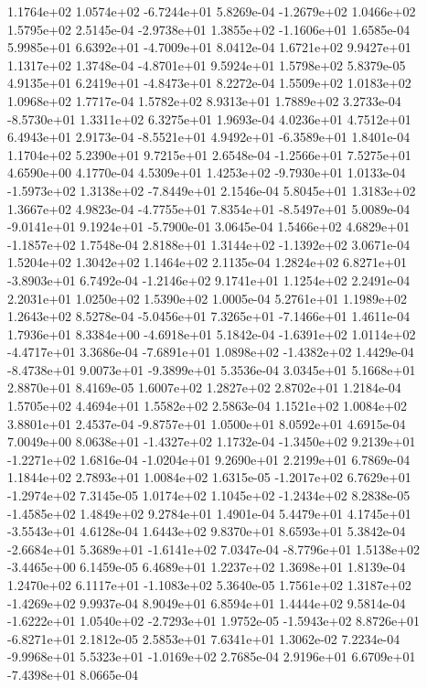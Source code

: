  1.1764e+02  1.0574e+02 -6.7244e+01  5.8269e-04
-1.2679e+02  1.0466e+02  1.5795e+02  2.5145e-04
-2.9738e+01  1.3855e+02 -1.1606e+01  1.6585e-04
 5.9985e+01  6.6392e+01 -4.7009e+01  8.0412e-04
1.6721e+02 9.9427e+01 1.1317e+02  1.3748e-04
-4.8701e+01  9.5924e+01  1.5798e+02  5.8379e-05
 4.9135e+01  6.2419e+01 -4.8473e+01  8.2272e-04
1.5509e+02 1.0183e+02 1.0968e+02  1.7717e-04
1.5782e+02 8.9313e+01 1.7889e+02  3.2733e-04
-8.5730e+01  1.3311e+02  6.3275e+01  1.9693e-04
4.0236e+01 4.7512e+01 6.4943e+01  2.9173e-04
-8.5521e+01  4.9492e+01 -6.3589e+01  1.8401e-04
1.1704e+02 5.2390e+01 9.7215e+01  2.6548e-04
-1.2566e+01  7.5275e+01  4.6590e+00  4.1770e-04
 4.5309e+01  1.4253e+02 -9.7930e+01  1.0133e-04
-1.5973e+02  1.3138e+02 -7.8449e+01  2.1546e-04
5.8045e+01 1.3183e+02 1.3667e+02  4.9823e-04
-4.7755e+01  7.8354e+01 -8.5497e+01  5.0089e-04
-9.0141e+01  9.1924e+01 -5.7900e-01  3.0645e-04
 1.5466e+02  4.6829e+01 -1.1857e+02  1.7548e-04
 2.8188e+01  1.3144e+02 -1.1392e+02  3.0671e-04
1.5204e+02 1.3042e+02 1.1464e+02  2.1135e-04
 1.2824e+02  6.8271e+01 -3.8903e+01  6.7492e-04
-1.2146e+02  9.1741e+01  1.1254e+02  2.2491e-04
2.2031e+01 1.0250e+02 1.5390e+02  1.0005e-04
5.2761e+01 1.1989e+02 1.2643e+02  8.5278e-04
-5.0456e+01  7.3265e+01 -7.1466e+01  1.4611e-04
 1.7936e+01  8.3384e+00 -4.6918e+01  5.1842e-04
-1.6391e+02  1.0114e+02 -4.4717e+01  3.3686e-04
-7.6891e+01  1.0898e+02 -1.4382e+02  1.4429e-04
-8.4738e+01  9.0073e+01 -9.3899e+01  5.3536e-04
3.0345e+01 5.1668e+01 2.8870e+01  8.4169e-05
1.6007e+02 1.2827e+02 2.8702e+01  1.2184e-04
1.5705e+02 4.4694e+01 1.5582e+02  2.5863e-04
1.1521e+02 1.0084e+02 3.8801e+01  2.4537e-04
-9.8757e+01  1.0500e+01  8.0592e+01  4.6915e-04
 7.0049e+00  8.0638e+01 -1.4327e+02  1.1732e-04
-1.3450e+02  9.2139e+01 -1.2271e+02  1.6816e-04
-1.0204e+01  9.2690e+01  2.2199e+01  6.7869e-04
1.1844e+02 2.7893e+01 1.0084e+02  1.6315e-05
-1.2017e+02  6.7629e+01 -1.2974e+02  7.3145e-05
 1.0174e+02  1.1045e+02 -1.2434e+02  8.2838e-05
-1.4585e+02  1.4849e+02  9.2784e+01  1.4901e-04
 5.4479e+01  4.1745e+01 -3.5543e+01  4.6128e-04
1.6443e+02 9.8370e+01 8.6593e+01  5.3842e-04
-2.6684e+01  5.3689e+01 -1.6141e+02  7.0347e-04
-8.7796e+01  1.5138e+02 -3.4465e+00  6.1459e-05
6.4689e+01 1.2237e+02 1.3698e+01  1.8139e-04
 1.2470e+02  6.1117e+01 -1.1083e+02  5.3640e-05
 1.7561e+02  1.3187e+02 -1.4269e+02  9.9937e-04
8.9049e+01 6.8594e+01 1.4444e+02  9.5814e-04
-1.6222e+01  1.0540e+02 -2.7293e+01  1.9752e-05
-1.5943e+02  8.8726e+01 -6.8271e+01  2.1812e-05
2.5853e+01 7.6341e+01 1.3062e-02  7.2234e-04
-9.9968e+01  5.5323e+01 -1.0169e+02  2.7685e-04
 2.9196e+01  6.6709e+01 -7.4398e+01  8.0665e-04
